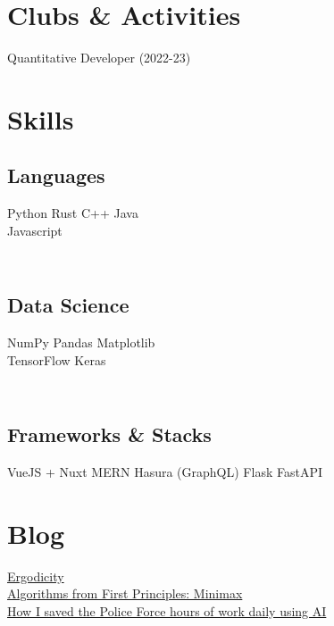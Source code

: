 \documentclass[]{cv}
\begin{document}
\begin{minipage}[t]{0.33\textwidth}

\section{Clubs \& Activities} 

\subtitle{NUS Investment Society (QF Dept.)}
\textbullet{} Quantitative Developer (2022-23)
\sectionsep


\section{Skills}
\subsection{Languages}
Python \textbullet{} 
Rust \textbullet{} 
C++ \textbullet{} 
Java \textbullet{}\\ 
Javascript

\subsection{\\Data Science}
NumPy \textbullet{} Pandas \textbullet{} Matplotlib \\
TensorFlow \textbullet{} Keras
\subsection{\\Frameworks \& Stacks}
VueJS + Nuxt \textbullet{} MERN \textbullet{} Hasura (GraphQL) \textbullet{} Flask \textbullet{} FastAPI
\sectionsep


\section{Blog}
\textbullet{} \href{https://medium.com/@g-tejas/ergodicity-f60a3abfcdf8}{Ergodicity} \\
\textbullet{} \href{https://medium.com/becoming-human/algorithms-from-first-principles-minimax-1c57bd6640dc}{Algorithms from First Principles: Minimax} \\
\textbullet{} \href{https://medium.com/becoming-human/how-i-saved-the-police-force-hours-of-work-daily-using-artificial-intelligence-7134e62b982c}{How I saved the Police Force hours of work daily using AI}
\sectionsep

%
%

\end{minipage} 
\end{document}
